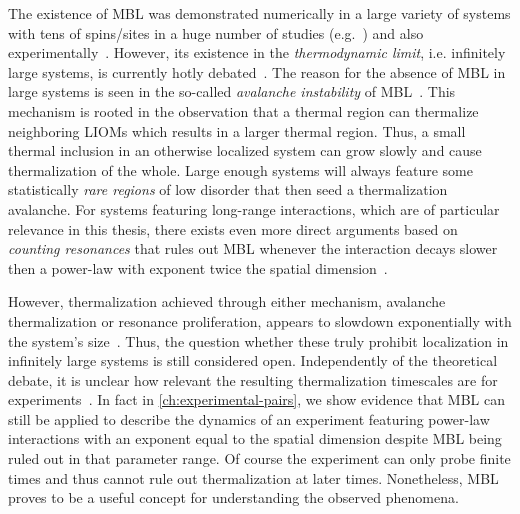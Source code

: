 The existence of MBL was demonstrated numerically in a large variety of systems with tens of spins/sites in a huge number of studies (e.g.~\cite{palManybodyLocalizationPhase2010,iyerManyBodyLocalizationQuasiperiodic2013,luitzManybodyLocalizationEdge2015,schifferManybodyLocalizationSpin2019,chandaManybodyLocalizationTransition2020}) and also experimentally~\cite{schreiberObservationManybodyLocalization2015,choiObservationDiscreteTimecrystalline2017,lukinProbingEntanglementManybody2019,rispoliQuantumCriticalBehaviour2019}. However, its existence in the \emph{thermodynamic limit}, i.e. infinitely large systems, is currently hotly debated~\cite{abaninDistinguishingLocalizationChaos2021,morningstarAvalanchesManybodyResonances2022,haManyBodyResonancesAvalanche2023,scoccoThermalizationPropagationFront2024}. The reason for the absence of MBL in large systems is seen in the so-called \emph{avalanche instability} of MBL~\cite{ponteThermalInclusionsHow2017,thieryManyBodyDelocalizationQuantum2018,crowleyAvalancheInducedCoexisting2020,morningstarAvalanchesManybodyResonances2022}. This mechanism is rooted in the observation that a thermal region can thermalize neighboring LIOMs which results in a larger thermal region. Thus, a small thermal inclusion in an otherwise localized system can grow slowly and cause thermalization of the whole. Large enough systems will always feature some statistically \emph{rare regions} of low disorder that then seed a thermalization avalanche.
For systems featuring long-range interactions, which are of particular relevance in this thesis, there exists even more direct arguments based on \emph{counting resonances} that rules out MBL whenever the interaction decays slower then a power-law with exponent twice the spatial dimension~\cite{burinEnergyDelocalizationStrongly2006,yaoManyBodyLocalizationDipolar2014,burinManybodyDelocalizationStrongly2015,burinLocalizationRandomXY2015}.

However, thermalization achieved through either mechanism, avalanche thermalization or resonance proliferation, appears to slowdown exponentially with the system's size~\cite{gopalakrishnanInstabilityManybodyLocalized2019,nandkishoreCriticalLocalizationVan2022,scoccoThermalizationPropagationFront2024}. Thus, the question whether these truly prohibit localization in infinitely large systems is still considered open. Independently of the theoretical debate, it is unclear how relevant the resulting thermalization timescales are for experiments~\cite{longPhenomenologyPrethermalManyBody2023}. 
In fact in \autoref{ch:experimental-pairs}, we show evidence that MBL can still be applied to describe the dynamics of an experiment featuring power-law interactions with an exponent equal to the spatial dimension despite MBL being ruled out in that parameter range. Of course the experiment can only probe finite times and thus cannot rule out thermalization at later times. Nonetheless, MBL proves to be a useful concept for understanding the observed phenomena.

